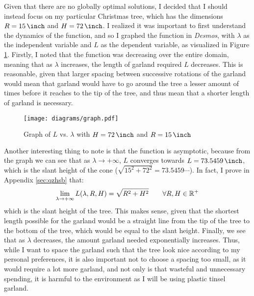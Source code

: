 Given that there are no globally optimal solutions, I decided that I should instead focus on my particular Christmas tree, which has the dimensions $R=\US{15}{\inch}$ and $H=\US{72}{\inch}$. I realized it was important to first understand the dynamics of the function, and so I graphed the function in \emph{Desmos}, with $\lambda$ as the independent variable and $L$ as the dependent variable, as visualized in Figure \ref{fig:graph}. Firstly, I noted that the function was decreasing over the entire domain, meaning that as $\lambda$ increases, the length of garland required $L$ decreases. This is reasonable, given that larger spacing between successive rotations of the garland would mean that garland would have to go around the tree a lesser amount of times before it reaches to the tip of the tree, and thus mean that a shorter length of garland is necessary.
\begin{figure}[H]
    \vspace*{5pt}
    \centering
    \texttt{[image: diagrams/graph.pdf]}
    \caption{Graph of $L$ vs. $\lambda$ with $H=\US{72}{\inch}$ and $R=\US{15}{\inch}$} \label{fig:graph}
    \vspace*{-15pt}
\end{figure}
\noindent Another interesting thing to note is that the function is asymptotic, because from the graph we can see that as $\lambda \rightarrow +\infty$, $L$ converges towards $L = \US{73.5459}{\inch}$, which is the slant height of the cone ($\sqrt{15^2+72^2} = 73.5459\cdots$). In fact, I prove in Appendix \ref{sec:qzhsb} that:
\begin{equation}
    \lim_{\lambda \to +\infty} L(\lambda, R, H) = \sqrt{R^2+H^2} \qquad \forall R, H \in \mathbb{R}^+
\end{equation}
which is the slant height of the tree. This makes sense, given that the shortest length possible for the garland would be a straight line from the tip of the tree to the bottom of the tree, which would be equal to the slant height. Finally, we see that as $\lambda$ decreases, the amount garland needed exponentially increases. Thus, while I want to space the garland such that the tree look nice according to my personal preferences, it is also important not to choose a spacing too small, as it would require a lot more garland, and not only is that wasteful and unnecessary spending, it is harmful to the environment as I will be using plastic tinsel garland.

